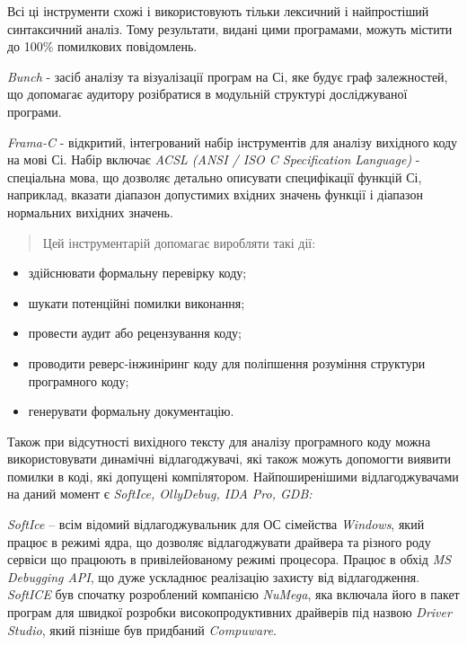 Всі ці інструменти схожі і використовують тільки лексичний і найпростіший синтаксичний аналіз. Тому результати, видані цими програмами, можуть містити до 100\% помилкових повідомлень.

{\it Bunch} - засіб аналізу та візуалізації програм на Сі, яке будує граф залежностей, що допомагає аудитору розібратися в модульній структурі досліджуваної програми.

{\it Frama-C} - відкритий, інтегрований набір інструментів для аналізу вихідного коду на мові Сі. Набір включає {\it ACSL (ANSI / ISO C Specification Language)} - спеціальна мова, що дозволяє детально описувати специфікації функцій Сі, наприклад, вказати діапазон допустимих вхідних значень функції і діапазон нормальних вихідних значень.
\begin{quote}

Цей інструментарій допомагає виробляти такі дії:
\end{quote}
\begin{itemize}
\item {} 
здійснювати формальну перевірку коду;

\item {} 
шукати потенційні помилки виконання;

\item {} 
провести аудит або рецензування коду;

\item {} 
проводити реверс-інжиніринг коду для поліпшення розуміння структури програмного коду;

\item {} 
генерувати формальну документацію.

\end{itemize}

Також при відсутності вихідного тексту для аналізу програмного коду можна використовувати динамічні відлагоджувачі, які також можуть допомогти виявити помилки в коді, які допущені компілятором.
Найпоширенішими відлагоджувачами на даний момент є {\it SoftIce, OllyDebug, IDA Pro, GDB:}

{\it SoftIce} – всім відомий відлагоджувальник для ОС сімейства {\it Windows}, який працює в режимі ядра, що дозволяє відлагоджувати драйвера та різного роду сервіси що працюють в привілейованому режимі процесора. Працює в обхід {\it MS Debugging API}, що дуже ускладнює реалізацію захисту від відлагодження. {\it SoftICE}  був спочатку розроблений компанією {\it NuMega}, яка включала його в пакет програм для швидкої розробки високопродуктивних драйверів під назвою {\it Driver Studio}, який пізніше був придбаний {\it Compuware}.

